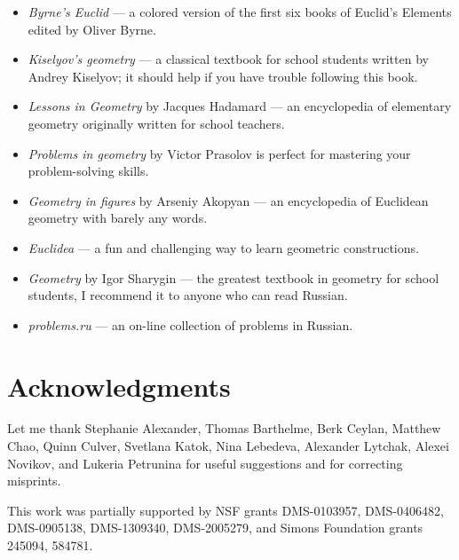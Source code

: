 \begin{itemize}
\item {}\emph{Byrne's Euclid} \cite{byrne} --- a colored version of the first six books of Euclid's Elements edited by Oliver Byrne. 

\item {}\emph{Kiselyov's geometry} \cite{kiselev} ---
a classical textbook for school students written by Andrey Kiselyov; it should help if you have trouble following this book.

\item {}\emph{Lessons in Geometry} by Jacques Hadamard \cite{hadamard} --- an encyclopedia of elementary geometry originally written for school teachers.



\item {}\emph{Problems in geometry} by Victor Prasolov\cite{prasolov}  is perfect for mastering your problem-solving skills.

\item {}\emph{Geometry in figures} by Arseniy Akopyan \cite{akopyan} --- an encyclopedia of Euclidean geometry with barely any words.

\item {}\emph{Euclidea} \cite{euclidea} --- a fun and challenging way to learn geometric constructions.
 
\item {}\emph{Geometry} by Igor Sharygin \cite{sharygin} --- the greatest textbook in geometry for school students, I recommend it to anyone who can read Russian.

\item {}\emph{problems.ru} \cite{zadachi} --- an on-line collection of problems in Russian.

\end{itemize}

\section{Acknowledgments}

{\sloppy

Let me thank 
Stephanie Alexander,
Thomas Barthelme,
Berk Ceylan,
Matthew Chao, 
Quinn Culver,
Svetlana Katok, 
Nina Lebedeva,
Alexander Lytchak,
Alexei Novikov,
and Lukeria Petrunina
for useful suggestions and for correcting misprints.

This work was partially supported by
NSF grants
DMS-0103957,
DMS-0406482,
DMS-0905138,
DMS-1309340,
DMS-2005279,
and Simons Foundation grants 
245094, 584781.

}

